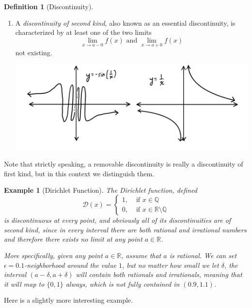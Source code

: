 \documentclass{article}
\newtheorem{example}{Example}[section]
\theoremstyle{remark}
\theoremstyle{definition}
\newtheorem{definition}{Definition}[section]
\begin{document}
\begin{definition}[Discontinuity]
\begin{enumerate}
\begin{center}
    \end{center}
    \item A \textit{discontinuity of second kind}, also known as an essential discontinuity, is characterized by at least one of the two limits 
    \[\lim_{x \rightarrow a-0} f(x) \text{ and } \lim_{x \rightarrow a+0} f(x)\]
    not existing. 
    \begin{center}
        \includegraphics[scale=0.27]{img/Discontinuity_Second.PNG}
    \end{center}
\end{enumerate}
Note that strictly speaking, a removable discontinuity is really a discontinuity of first kind, but in this context we distinguish them. 
\end{definition}

\begin{example}[Dirichlet Function]
The Dirichlet function, defined
\[\mathcal{D}(x) = \begin{cases}
1, & \text{ if } x \in \mathbb{Q} \\
0, & \text{ if } x \in \mathbb{R} \setminus \mathbb{Q} 
\end{cases}\]
is discontinuous at every point, and obviously all of its discontinuities are of second kind, since in every interval there are both rational and irrational numbers and therefore there exists no limit at any point $a \in \mathbb{R}$. 

More specifically, given any point $a \in \mathbb{R}$, assume that $a$ is rational. We can set $\epsilon = 0.1$-neighborhood around the value $1$, but no matter how small we let $\delta$, the interval $(a - \delta, a + \delta)$ will contain both rationals and irrationals, meaning that it will map to $\{0,1\}$ always, which is not fully contained in $(0.9, 1.1)$.  
\end{example}

Here is a slightly more interesting example. 
\end{document}

